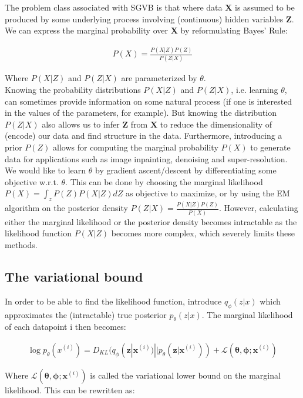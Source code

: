 \documentclass{article}
\begin{document}
The problem class associated with SGVB is that where data $\mathbf{X}$ is assumed to be produced by some underlying process involving (continuous) hidden variables $\mathbf{Z}$. We can express the marginal probability over $\mathbf{X}$ by reformulating Bayes' Rule:

\begin{align}
P(X) = \frac{P(X|Z)P(Z)}{P(Z|X)}
\end{align}

Where $P(X|Z)$ and $P(Z|X)$ are parameterized by $\theta$.
\\

Knowing the probability distributions $P(X|Z)$ and $P(Z|X)$, i.e. learning $\theta$, can sometimes provide information on some natural process (if one is interested in the values of the parameters, for example). But knowing the distribution $P(Z|X)$ also allows us to infer $\mathbf{Z}$ from $\mathbf{X}$ to reduce the dimensionality of (encode) our data and find structure in the data. Furthermore, introducing a prior $P(Z)$ allows for computing the marginal probability $P(X)$ to generate data for applications such as image inpainting, denoising and super-resolution.
We would like to learn $\theta$ by gradient ascent/descent by differentiating some objective w.r.t. $\theta$. This can be done by choosing the marginal likelihood $P(X) = \int_z P(Z) P(X|Z) dZ$ as objective to maximize, or by using the EM algorithm on the posterior density $ P(Z|X) = \frac{P(X|Z)P(Z)}{P(X)}$. However, calculating either  the marginal likelihood or the posterior density becomes intractable as the likelihood function $P(X|Z)$ becomes more complex, which severely limits these methods.

\subsection{The variational bound}

In order to be able to find the likelihood function, \cite{kingma2013auto} introduce $q_\phi(z|x)$ which approximates the (intractable) true posterior $p_\theta(z|x)$. The marginal likelihood of each datapoint i then becomes:

\begin{align}
	\log p_\theta(x^{(i)}) = D_{KL}(q_\phi(\mathbf{z}|\mathbf{x}^{(i)}) || p_\theta(\mathbf{z}|\mathbf{x}^{(i)})) + \mathcal{L}(\mathbf{\theta}, \mathbf{\phi}; \mathbf{x}^{(i)})
\end{align} 

Where $\mathcal{L}(\mathbf{\theta}, \mathbf{\phi}; \mathbf{x}^{(i)})$ is called the variational lower bound on the marginal likelihood. This can be rewritten as:
\end{document}
